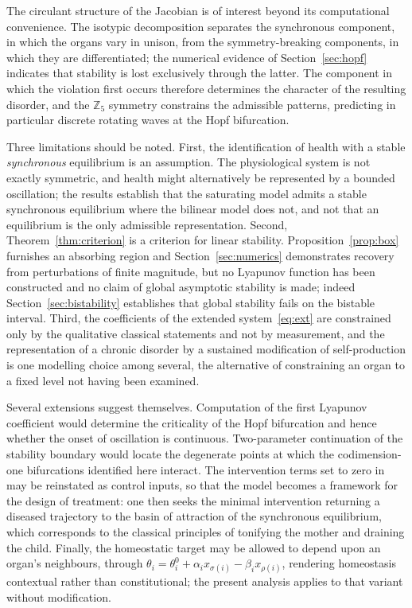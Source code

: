 \documentclass[11pt]{article}
\newcommand{\Z}{{\mathbb{Z}}}
\theoremstyle{definition}
\theoremstyle{remark}
\begin{document}
	The circulant structure of the Jacobian is of interest beyond its computational
	convenience. The isotypic decomposition separates the synchronous component, in which
	the organs vary in unison, from the symmetry-breaking components, in which they are
	differentiated; the numerical evidence of Section~\ref{sec:hopf} indicates that
	stability is lost exclusively through the latter. The component in which the
	violation first occurs therefore determines the character of the resulting disorder,
	and the $\Z_5$ symmetry constrains the admissible patterns, predicting in particular
	discrete rotating waves at the Hopf bifurcation.
	
	Three limitations should be noted. First, the identification of health with a stable
	\emph{synchronous} equilibrium is an assumption. The physiological system is not
	exactly symmetric, and health might alternatively be represented by a bounded
	oscillation; the results establish that the saturating model admits a stable
	synchronous equilibrium where the bilinear model does not, and not that an
	equilibrium is the only admissible representation. Second,
	Theorem~\ref{thm:criterion} is a criterion for linear stability.
	Proposition~\ref{prop:box} furnishes an absorbing region and
	Section~\ref{sec:numerics} demonstrates recovery from perturbations of finite
	magnitude, but no Lyapunov function has been constructed and no claim of global
	asymptotic stability is made; indeed Section~\ref{sec:bistability} establishes that
	global stability fails on the bistable interval. Third, the coefficients of the
	extended system~\eqref{eq:ext} are constrained only by the qualitative classical
	statements and not by measurement, and the representation of a chronic disorder by a
	sustained modification of self-production is one modelling choice among several, the
	alternative of constraining an organ to a fixed level not having been examined.
	
	Several extensions suggest themselves. Computation of the first Lyapunov coefficient
	would determine the criticality of the Hopf bifurcation and hence whether the onset
	of oscillation is continuous. Two-parameter continuation of the stability boundary
	would locate the degenerate points at which the codimension-one bifurcations
	identified here interact. The intervention terms set to zero in~\cite{Lin2020} may be
	reinstated as control inputs, so that the model becomes a framework for the design of
	treatment: one then seeks the minimal intervention returning a diseased trajectory to
	the basin of attraction of the synchronous equilibrium, which corresponds to the
	classical principles of tonifying the mother and draining the child. Finally, the
	homeostatic target may be allowed to depend upon an organ's neighbours, through
	$\theta_i=\theta_i^0+\alpha_i x_{\sigma(i)}-\beta_i x_{\rho(i)}$, rendering
	homeostasis contextual rather than constitutional; the present analysis applies to
	that variant without modification.
	
\end{document}
